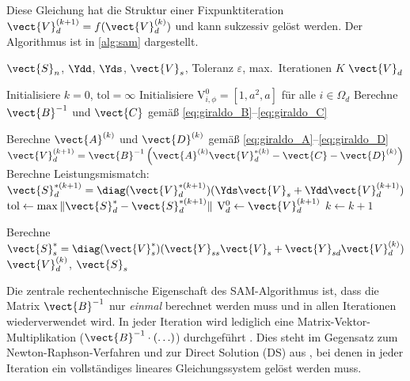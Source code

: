 Diese Gleichung hat die Struktur einer Fixpunktiteration $\vect{V}_d^{(k+1)} = f(\vect{V}_d^{(k)})$ und kann sukzessiv gelöst werden. Der Algorithmus ist in \cref{alg:sam} dargestellt.

\begin{algorithm}[H]
	\caption{Successive Approximation Method (SAM) nach \cite{Giraldo2022}}
	\label{alg:sam}
	\begin{algorithmic}[1]
		\REQUIRE $\vect{S}_n$, $\Ydd$, $\Yds$, $\vect{V}_s$, Toleranz $\varepsilon$, max.\ Iterationen $K$
		\ENSURE $\vect{V}_d$
		
		\STATE Initialisiere $k = 0$, $\text{tol} = \infty$
		\STATE Initialisiere $\mathrm{V}^0_{i,\phi} = [1, a^2, a]$ für alle $i \in \Omega_d$ 
		\STATE Berechne $\vect{B}^{-1}$ und $\vect{C}$ gemäß \eqref{eq:giraldo_B}--\eqref{eq:giraldo_C} 
		
		\STATE Berechne $\vect{A}^{(k)}$ und $\vect{D}^{(k)}$ gemäß \eqref{eq:giraldo_A}--\eqref{eq:giraldo_D}
		\STATE $\vect{V}_d^{(k+1)} = \vect{B}^{-1}\left(\vect{A}^{(k)} \vect{V}_d^{*(k)} - \vect{C} - \vect{D}^{(k)}\right)$
		\STATE Berechne Leistungsmismatch: $\vect{S}_d^{*(k+1)} = \diag(\vect{V}_d^{*(k+1)})(\Yds\vect{V}_s + \Ydd\vect{V}_d^{(k+1)})$
		\STATE $\text{tol} \leftarrow \max\|\vect{S}_d^* - \vect{S}_d^{*(k+1)}\|$
		\STATE $\mathrm{V}^0_d \leftarrow \vect{V}_d^{(k+1)}$ 
		\STATE $k \leftarrow k + 1$
		\ENDWHILE
		
		\STATE Berechne $\vect{S}_s^* = \diag(\vect{V}_s^*)(\vect{Y}_{ss}\vect{V}_s + \vect{Y}_{sd}\vect{V}_d^{(k)})$
		\RETURN $\vect{V}_d^{(k)}$, $\vect{S}_s$
	\end{algorithmic}
\end{algorithm}

Die zentrale rechentechnische Eigenschaft des SAM-Algorithmus ist, dass die Matrix $\vect{B}^{-1}$ nur \textit{einmal} berechnet werden muss und in allen Iterationen wiederverwendet wird. In jeder Iteration wird lediglich eine Matrix-Vektor-Multiplikation ($\vect{B}^{-1} \cdot (\ldots)$) durchgeführt \cite{Giraldo2022}. Dies steht im Gegensatz zum Newton-Raphson-Verfahren und zur Direct Solution (DS) aus \cite{Giraldo2022}, bei denen in jeder Iteration ein vollständiges lineares Gleichungssystem gelöst werden muss.

